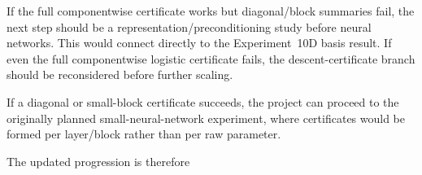 If the full componentwise certificate works but diagonal/block summaries fail, the next step should be a representation/preconditioning study before neural networks. This would connect directly to the Experiment~10D basis result. If even the full componentwise logistic certificate fails, the descent-certificate branch should be reconsidered before further scaling.

If a diagonal or small-block certificate succeeds, the project can proceed to the originally planned small-neural-network experiment, where certificates would be formed per layer/block rather than per raw parameter.

The updated progression is therefore
\begin{center}
\end{center}
